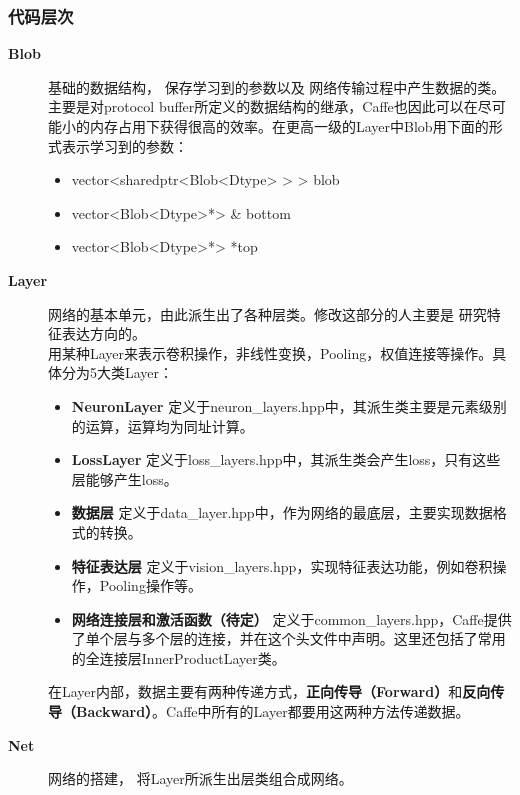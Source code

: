 \documentclass[12pt]{article}
\begin{document}
\subsubsection{代码层次}
\begin{description}
\item[\textbf{Blob}] 基础的数据结构，{\color{blue} 保存学习到的参数}以及{\color{blue} 网络传输过程中产生数据的类}。\\
	主要是对protocol buffer所定义的数据结构的继承，Caffe也因此可以在尽可能小的内存占用下获得很高的效率。在更高一级的Layer中Blob用下面的形式表示学习到的参数：
	\begin{itemize}
	\item vector<sharedptr<Blob<Dtype> > > blob
	\item vector<Blob<Dtype>*> \& bottom
	\item vector<Blob<Dtype>*> *top
	\end{itemize}
\item[\textbf{Layer}] 网络的基本单元，由此派生出了各种层类。修改这部分的人主要是{\color{blue} 研究特征表达}方向的。\\
	用某种Layer来表示卷积操作，非线性变换，Pooling，权值连接等操作。具体分为5大类Layer：
	\begin{itemize}
	\item \textbf{NeuronLayer} \hspace{0.1in} 定义于neuron\_layers.hpp中，其派生类主要是元素级别的运算，运算均为同址计算。
	\item \textbf{LossLayer} \hspace{0.1in} 定义于loss\_layers.hpp中，其派生类会产生loss，只有这些层能够产生loss。
	\item \textbf{数据层} \hspace{0.1in} 定义于data\_layer.hpp中，作为网络的最底层，主要实现数据格式的转换。
	\item \textbf{特征表达层} \hspace{0.1in} 定义于vision\_layers.hpp，实现特征表达功能，例如卷积操作，Pooling操作等。
	\item \textbf{网络连接层和激活函数（待定）} \hspace{0.1in} 定义于common\_layers.hpp，Caffe提供了单个层与多个层的连接，并在这个头文件中声明。这里还包括了常用的全连接层InnerProductLayer类。
	\end{itemize}
	在Layer内部，数据主要有两种传递方式，\textbf{正向传导（Forward）}和\textbf{反向传导（Backward）}。Caffe中所有的Layer都要用这两种方法传递数据。
\item[\textbf{Net}] 网络的搭建，{\color{blue} 将Layer所派生出层类组合成网络}。\\

\end{description}
\end{document}
